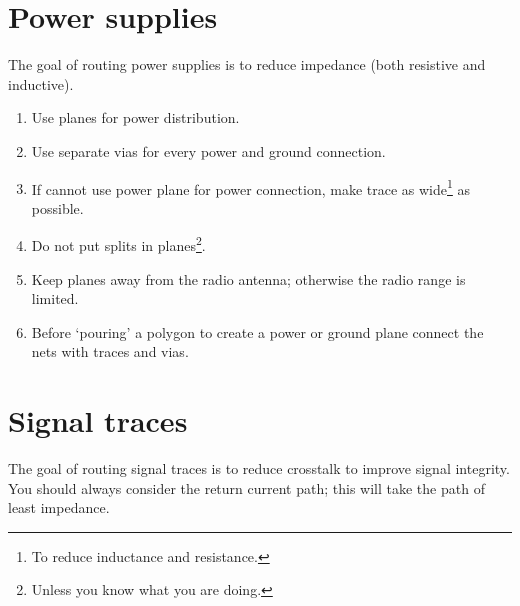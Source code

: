 \section{Power supplies}

The goal of routing power supplies is to reduce impedance (both
resistive and inductive).

\begin{enumerate}

\item Use planes for power distribution.

\item Use separate vias for every power and ground connection.

\item If cannot use power plane for power connection, make trace as
  wide\footnote{To reduce inductance and resistance.} as possible.

\item Do not put splits in planes\footnote{Unless you know what you
  are doing.}.

\item Keep planes away from the radio antenna; otherwise the radio
  range is limited.

\item Before `pouring' a polygon to create a power or ground plane
  connect the nets with traces and vias.
\end{enumerate}


\section{Signal traces}

The goal of routing signal traces is to reduce crosstalk to improve
signal integrity.  You should always consider the return current path;
this will take the path of least impedance.



